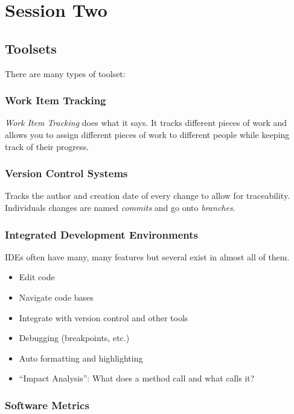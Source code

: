 \section{Session Two}\label{sec:session_two}

\subsection{Toolsets}\label{sub:toolsets}

There are many types of toolset:

\subsubsection{Work Item Tracking}\label{ssub:work_item_tracking}

\emph{Work Item Tracking} does what it says.
It tracks different pieces of work and allows you to assign different pieces of work to different people while keeping track of their progress.

\subsubsection{Version Control Systems}\label{ssub:version_control_systems}

Tracks the author and creation date of every change to allow for traceability.
Individuals changes are named \emph{commits} and go onto \emph{branches}.

\subsubsection{Integrated Development Environments}\label{ssub:integrated_development_environments}

IDEs often have many, many features but several exist in almost all of them.

\begin{itemize}
	\item Edit code
	\item Navigate code bases
	\item Integrate with version control and other tools
	\item Debugging (breakpoints, etc.)
	\item Auto formatting and highlighting
	\item ``Impact Analysis'': What does a method call and what calls it?
\end{itemize}

\subsubsection{Software Metrics}\label{ssub:software_metrics}

